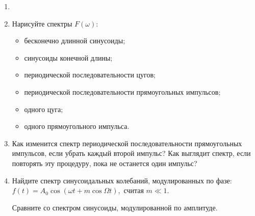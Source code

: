 \begin{lab:questions}
\begin{enumerate}
	\item 
	\item Нарисуйте спектры $F(\omega)$:
	\begin{itemize}
		\item бесконечно длинной синусоиды;
		\item синусоиды конечной длины;
		\item периодической последовательности цугов;
		\item периодической последовательности прямоугольных импульсов;
		\item одного цуга;
		\item одного прямоугольного импульса.
	\end{itemize}
	
	\item Как изменится спектр периодической последовательности прямоугольных импульсов, если убрать каждый второй импульс? Как выглядит спектр, если повторять эту процедуру, пока не останется один импульс?
	\item Найдите спектр синусоидальных колебаний, модулированных по фазе:
$f(t)=A_0\cos(\omega t + m \cos \Omega t),$
считая $m\ll 1$.

Сравните со спектром синусоиды, модулированной по амплитуде.
\end{enumerate}
\end{lab:questions}






